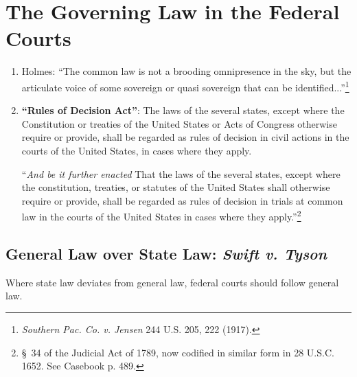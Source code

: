 \section{The Governing Law in the Federal Courts}

\begin{enumerate}
    \item Holmes: ``The common law is not a brooding omnipresence in the sky, 
    but the articulate voice of some sovereign or quasi sovereign that can be 
    identified...''\footnote{\emph{Southern Pac. Co. v. Jensen} 244 U.S. 205, 
    222 (1917).}
    \item \textbf{``Rules of Decision Act''}: The laws of the several states, except 
    where the Constitution or treaties of the United States or Acts of 
    Congress otherwise require or provide, shall be regarded as rules of 
    decision in civil actions in the courts of the United States, in cases 
    where they apply.


    ``\emph{And be it further enacted} That the laws of the several states, 
    except where the constitution, treaties, or statutes of the United States 
    shall otherwise require or provide, shall be regarded as rules of decision 
    in trials at common law in the courts of the United States in cases where 
    they apply.''\footnote{\S\ 34 of the Judicial Act of 1789, now codified in 
    similar form in 28 U.S.C. 1652. See Casebook p. 489.}
\end{enumerate}

\subsection{General Law over State Law: \emph{Swift v. Tyson}}

Where state law deviates from general law, federal courts should follow 
general law.

